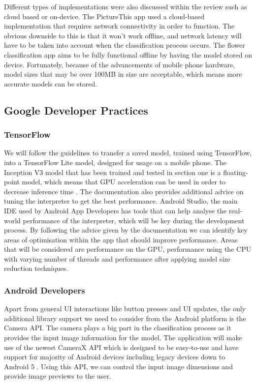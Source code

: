 \documentclass[12pt,a4paper]{report}
\begin{document}
Different types of implementations were also discussed within the review such as cloud based or on-device. 
The PictureThis app used a cloud-based implementation that requires network connectivity in order to function. 
The obvious downside to this is that it won't work offline, and network latency will have to be taken into account when 
the classification process occurs. The flower classification app aims to be fully functional offline by having the model
stored on device. Fortunately, because of the advancements of mobile phone hardware, model sizes that may be over 100MB 
in size are acceptable, which means more accurate models can be stored.

\subsection{Google Developer Practices}

\subsubsection{TensorFlow}

We will follow the guidelines to transfer a saved model, trained using TensorFlow, into a TensorFlow Lite model, 
designed for usage on a mobile phone. The Inception V3 model that has been trained and tested in section one is a 
floating-point model, which means that GPU acceleration can be used in order to decrease inference time 
\citep{TFGPU}. The documentation also provides additional advice on tuning the interpreter to get the best 
performance. Android Studio, the main IDE used by Android App Developers has tools that can help analyse the 
real-world performance of the interpreter, which will be key during the development process. By following the advice 
given by the documentation we can identify key areas of optimisation within the app that should improve performance. 
Areas that will be considered are performance on the GPU, performance using the CPU with varying number of threads and  
performance after applying model size reduction techniques.

\subsubsection{Android Developers}

Apart from general UI interactions like button presses and UI updates, the only additional library support we need to 
consider from the Android platform is the Camera API. The camera plays a big part in the classification process as it 
provides the input image information for the model. The application will make use of the newest CameraX API which is 
designed to be easy-to-use and have support for majority of Android devices including legacy devices down to Android 5 
\citep{ADCameraX}. Using this API, we can control the input image dimensions and provide image previews to the 
user.
\end{document}
